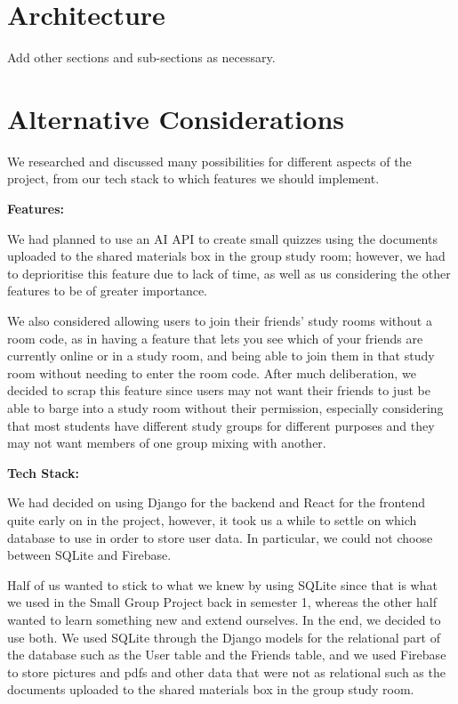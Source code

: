 \section{Architecture}
\label{sect:architecture}
\begin{expectations}
Add other sections and sub-sections as necessary.
\end{expectations}

\section{Alternative Considerations}
\label{sect:alternative-considerations}
We researched and discussed many possibilities for different aspects of the project, from our tech stack to which features we should implement.

\textbf{Features:}

We had planned to use an AI API to create small quizzes using the documents uploaded to the shared materials box in the group study room; however, we had to deprioritise this feature due to lack of time, as well as us considering the other features to be of greater importance.

We also considered allowing users to join their friends' study rooms without a room code, as in having a feature that lets you see which of your friends are currently online or in a study room, and being able to join them in that study room without needing to enter the room code. After much deliberation, we decided to scrap this feature since users may not want their friends to just be able to barge into a study room without their permission, especially considering that most students have different study groups for different purposes and they may not want members of one group mixing with another.


\textbf{Tech Stack:}

We had decided on using Django for the backend and React for the frontend quite early on in the project, however, it took us a while to settle on which database to use in order to store user data. In particular, we could not choose between SQLite and Firebase. 

Half of us wanted to stick to what we knew by using SQLite since that is what we used in the Small Group Project back in semester 1, whereas the other half wanted to learn something new and extend ourselves. In the end, we decided to use both. We used SQLite through the Django models for the relational part of the database such as the User table and the Friends table, and we used Firebase to store pictures and pdfs and other data that were not as relational such as the documents uploaded to the shared materials box in the group study room.

